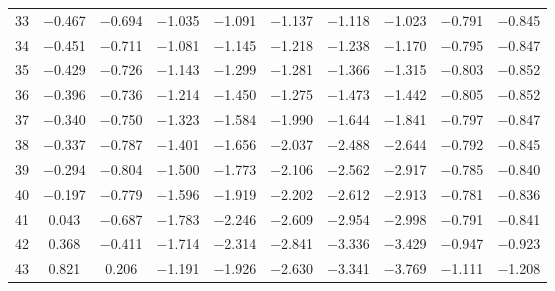 \begin{table}[htpb]
\begin{tabular}{cccccccccc}
\num{33} & \num{-0.467} & \num{-0.694} & \num{-1.035} & \num{-1.091} & \num{-1.137} & \num{-1.118} & \num{-1.023} & \num{-0.791} & \num{-0.845} \\
\num{34} & \num{-0.451} & \num{-0.711} & \num{-1.081} & \num{-1.145} & \num{-1.218} & \num{-1.238} & \num{-1.170} & \num{-0.795} & \num{-0.847} \\
\num{35} & \num{-0.429} & \num{-0.726} & \num{-1.143} & \num{-1.299} & \num{-1.281} & \num{-1.366} & \num{-1.315} & \num{-0.803} & \num{-0.852} \\
\num{36} & \num{-0.396} & \num{-0.736} & \num{-1.214} & \num{-1.450} & \num{-1.275} & \num{-1.473} & \num{-1.442} & \num{-0.805} & \num{-0.852} \\
\num{37} & \num{-0.340} & \num{-0.750} & \num{-1.323} & \num{-1.584} & \num{-1.990} & \num{-1.644} & \num{-1.841} & \num{-0.797} & \num{-0.847} \\
\num{38} & \num{-0.337} & \num{-0.787} & \num{-1.401} & \num{-1.656} & \num{-2.037} & \num{-2.488} & \num{-2.644} & \num{-0.792} & \num{-0.845} \\
\num{39} & \num{-0.294} & \num{-0.804} & \num{-1.500} & \num{-1.773} & \num{-2.106} & \num{-2.562} & \num{-2.917} & \num{-0.785} & \num{-0.840} \\
\num{40} & \num{-0.197} & \num{-0.779} & \num{-1.596} & \num{-1.919} & \num{-2.202} & \num{-2.612} & \num{-2.913} & \num{-0.781} & \num{-0.836} \\
\num{41} & \num{0.043} & \num{-0.687} & \num{-1.783} & \num{-2.246} & \num{-2.609} & \num{-2.954} & \num{-2.998} & \num{-0.791} & \num{-0.841} \\
\num{42} & \num{0.368} & \num{-0.411} & \num{-1.714} & \num{-2.314} & \num{-2.841} & \num{-3.336} & \num{-3.429} & \num{-0.947} & \num{-0.923} \\
\num{43} & \num{0.821} & \num{0.206} & \num{-1.191} & \num{-1.926} & \num{-2.630} & \num{-3.341} & \num{-3.769} & \num{-1.111} & \num{-1.208} \\
        \bottomrule
    \end{tabular}
\end{table}

